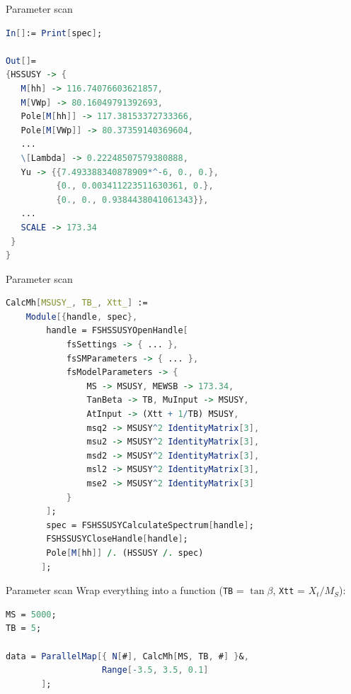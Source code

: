\documentclass[hyperref={pdfpagelabels=false},ngerman]{beamer}
\newcommand{\MS}{\ensuremath{M_S}}
\begin{document}
\begin{frame}{Parameter scan}
  \usebox{\listbox}
\end{frame}

\begin{lrbox}{\listbox}\begin{lstlisting}[language=Mathematica]
In[]:= Print[spec];

Out[]=
{HSSUSY -> {
   M[hh] -> 116.74076603621857,
   M[VWp] -> 80.16049791392693,
   Pole[M[hh]] -> 117.38153372733366,
   Pole[M[VWp]] -> 80.37359140369604,
   ...
   \[Lambda] -> 0.22248507579380888,
   Yu -> {{7.493388340878909*^-6, 0., 0.},
          {0., 0.003411223511630361, 0.},
          {0., 0., 0.9384438041061343}},
   ...
   SCALE -> 173.34
 }
}
\end{lstlisting}\end{lrbox} %

\begin{frame}{Parameter scan}
  \usebox{\listbox}
\end{frame}

\begin{lrbox}{\listbox}\begin{lstlisting}[language=Mathematica]
CalcMh[MSUSY_, TB_, Xtt_] :=
    Module[{handle, spec},
        handle = FSHSSUSYOpenHandle[
            fsSettings -> { ... },
            fsSMParameters -> { ... },
            fsModelParameters -> {
                MS -> MSUSY, MEWSB -> 173.34,
                TanBeta -> TB, MuInput -> MSUSY,
                AtInput -> (Xtt + 1/TB) MSUSY,
                msq2 -> MSUSY^2 IdentityMatrix[3],
                msu2 -> MSUSY^2 IdentityMatrix[3],
                msd2 -> MSUSY^2 IdentityMatrix[3],
                msl2 -> MSUSY^2 IdentityMatrix[3],
                mse2 -> MSUSY^2 IdentityMatrix[3]
            }
        ];
        spec = FSHSSUSYCalculateSpectrum[handle];
        FSHSSUSYCloseHandle[handle];
        Pole[M[hh]] /. (HSSUSY /. spec)
       ];
\end{lstlisting}\end{lrbox} %

\begin{frame}{Parameter scan}
  Wrap everything into a function (\texttt{TB} = $\tan\beta$, \texttt{Xtt} = $X_t/\MS$):\\[1em]
  \usebox{\listbox}
\end{frame}

\begin{lrbox}{\listbox}\begin{lstlisting}[language=Mathematica]
MS = 5000;
TB = 5;

data = ParallelMap[{ N[#], CalcMh[MS, TB, #] }&,
                   Range[-3.5, 3.5, 0.1]
       ];
\end{lstlisting}\end{lrbox} %
\end{document}
